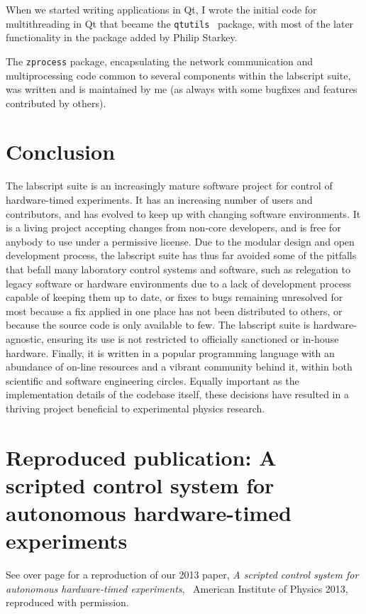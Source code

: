 When we started writing applications in Qt, I wrote the initial code for multithreading in Qt that became the \texttt{qtutils}~\cite{starkey_qtutils_2018} package, with most of the later functionality in the package added by Philip Starkey.

The \texttt{zprocess} package, encapsulating the network communication and multiprocessing code common to several components within the labscript suite, was written and is maintained by me (as always with some bugfixes and features contributed by others).

\section{Conclusion}

The labscript suite is an increasingly mature software project for control of hardware-timed experiments. It has an increasing number of users and contributors, and has evolved to keep up with changing software environments. It is a living project accepting changes from non-core developers, and is free for anybody to use under a permissive license. Due to the modular design and open development process, the labscript suite has thus far avoided some of the pitfalls that befall many laboratory control systems and software, such as relegation to legacy software or hardware environments due to a lack of development process capable of keeping them up to date, or fixes to bugs remaining unresolved for most because a fix applied in one place has not been distributed to others, or because the source code is only available to few. The labscript suite is hardware-agnostic, ensuring its use is not restricted to officially sanctioned or in-house hardware. Finally, it is written in a popular programming language with an abundance of on-line resources and a vibrant community behind it, within both scientific and software engineering circles. Equally important as the implementation details of the codebase itself, these decisions have resulted in a thriving project beneficial to experimental physics research.

\section{Reproduced publication: A scripted control system for autonomous hardware-timed experiments}

See over page for a reproduction of our 2013 paper, \emph{A scripted control system for autonomous hardware-timed experiments}, \textcopyright\ American Institute of Physics 2013, reproduced with permission.



